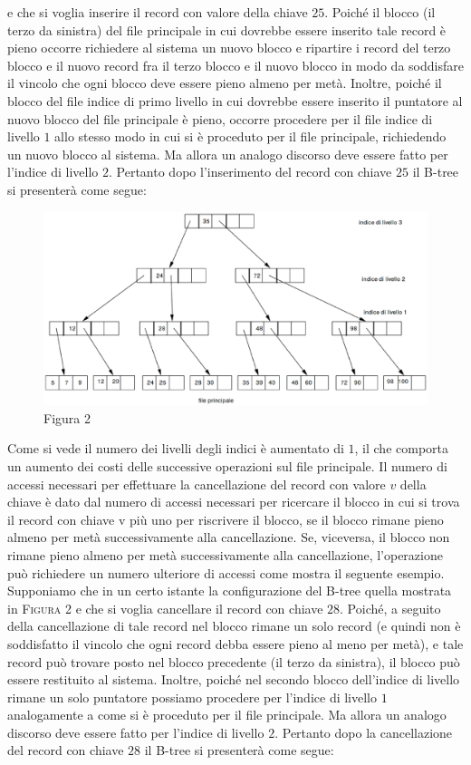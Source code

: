 e che si voglia inserire il record con valore della chiave $25$. Poiché il blocco (il terzo da sinistra) del
file principale in cui dovrebbe essere inserito tale record è pieno occorre richiedere al sistema un
nuovo blocco e ripartire i record del terzo blocco e il nuovo record fra il terzo blocco e il nuovo
blocco in modo da soddisfare il vincolo che ogni blocco deve essere pieno almeno per metà. Inoltre,
poiché il blocco del file indice di primo livello in cui dovrebbe essere inserito il puntatore al nuovo
blocco del file principale è pieno, occorre procedere per il file indice di livello $1$ allo stesso modo in
cui si è proceduto per il file principale, richiedendo un nuovo blocco al sistema. Ma allora un
analogo discorso deve essere fatto per l'indice di livello $2$. Pertanto dopo l'inserimento del record
con chiave $25$ il B-tree si presenterà come segue:

\begin{figure}[h!]
  \centering
  \includegraphics[width=430px]{img_5_3_4(2).eps}
  Figura 2
\end{figure}

Come si vede il numero dei livelli degli indici è aumentato di $1$, il che comporta un aumento dei
costi delle successive operazioni sul file principale.
Il numero di accessi necessari per effettuare la cancellazione del record con valore $v$ della chiave è
dato dal numero di accessi necessari per ricercare il blocco in cui si trova il record con chiave v più
uno per riscrivere il blocco, se il blocco rimane pieno almeno per metà successivamente alla
cancellazione. Se, viceversa, il blocco non rimane pieno almeno per metà successivamente alla
cancellazione, l'operazione può richiedere un numero ulteriore di accessi come mostra il seguente
esempio.\\
Supponiamo che in un certo istante la configurazione del B-tree quella mostrata in \textsc{Figura 2} e che si
voglia cancellare il record con chiave $28$. Poiché, a seguito della cancellazione di tale record nel
blocco rimane un solo record (e quindi non è soddisfatto il vincolo che ogni record debba essere
pieno al meno per metà), e tale record può trovare posto nel blocco precedente (il terzo da sinistra),
il blocco può essere restituito al sistema. Inoltre, poiché nel secondo blocco dell'indice di livello
rimane un solo puntatore possiamo procedere per l'indice di livello $1$ analogamente a come si è
proceduto per il file principale. Ma allora un analogo discorso deve essere fatto per l'indice di
livello $2$. Pertanto dopo la cancellazione del record con chiave $28$ il B-tree si presenterà come segue:

